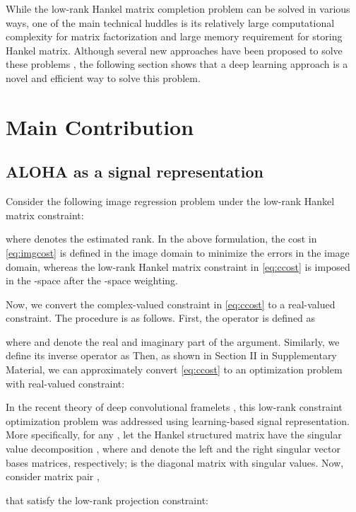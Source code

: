 \documentclass[10pt,journal]{IEEEtran}
\newcommand{\0}{{\boldsymbol{0}}}
\begin{document}
While the low-rank Hankel matrix completion problem   can be solved in various ways, 
one of the main technical huddles is its relatively large computational complexity for matrix factorization and  large memory 
requirement for storing Hankel matrix. 
Although several new approaches have been proposed to solve these problems \cite{ongie2017fast}, the following section shows that a deep learning approach is a novel and efficient way to solve this problem.

\section{Main Contribution}

\subsection{ALOHA as a signal representation}

Consider the following image regression problem under the  low-rank Hankel matrix constraint:

where   denotes the estimated rank. In the above formulation,  the cost in \eqref{eq:imgcost} is defined in the image domain to minimize the
errors in the image domain, whereas
the low-rank Hankel matrix constraint in \eqref{eq:ccost} is imposed in the -space after the -space weighting.



Now, we convert the complex-valued constraint in \eqref{eq:ccost}
to a  real-valued constraint.
The procedure is as follows. First, 
the operator   is defined as 

where  and  denote the real and imaginary part of the argument.
Similarly, we define its inverse operator   as 
Then, as shown in Section II in Supplementary Material, 
we can approximately convert \eqref{eq:ccost} to an 
optimization problem with real-valued constraint:



In the recent theory of deep convolutional framelets \cite{ye2017deep}, 
this low-rank constraint optimization problem was addressed  using  learning-based signal representation.
More specifically,
 for any  , let the Hankel structured matrix 
 have  the singular value decomposition
, 
where  and  denote the left and the right singular vector bases matrices, respectively;
 is the diagonal matrix with singular values.  
Now, consider
matrix pair  ,  

that 
satisfy the low-rank  projection constraint:
\end{document}

